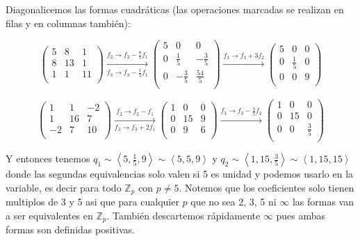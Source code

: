 \documentclass[12pt]{amsart}
\newcommand{\ZZ}{\mathbb{Z}}
\newcommand{\lp}{\left(}
\newcommand{\rp}{\right)}
\newcommand{\lc}{\left<}
\newcommand{\rc}{\right>}
\theoremstyle{plain}
\begin{document}
Diagonalicemos las formas cuadráticas (las operaciones 
marcadas se realizan en filas y en columnas también):

$$
\lp\begin{matrix}
    5&8&1 \\
    8&13&1 \\
    1&1&11 \\
\end{matrix}\rp
\xrightarrow[f_3 \to f_3-\frac{1}{5}f_1]{f_2 \to f_2-
\frac{8}{5}f_1}
\lp\begin{matrix}
    5&0&0 \\
    0&\frac{1}{5}&-\frac{3}{5} \\
    0&-\frac{3}{5}&\frac{54}{5} \\
\end{matrix}\rp
\xrightarrow{f_3 \to f_3+3f_2}
\lp\begin{matrix}
    5&0&0 \\
    0&\frac{1}{5}&0 \\
    0&0&9 \\
\end{matrix}\rp
$$

$$
\lp\begin{matrix}
    1&1&-2 \\
    1&16&7 \\
    -2&7&10 \\
\end{matrix}\rp
\xrightarrow[f_3 \to f_3+2f_1]{f_2 \to f_2-f_1}
\lp\begin{matrix}
    1&0&0 \\
    0&15&9 \\
    0&9&6 \\
\end{matrix}\rp
\xrightarrow{f_3 \to f_3-\frac{3}{5}f_2}
\lp\begin{matrix}
    1&0&0 \\
    0&15&0 \\
    0&0&\frac{3}{5} \\
\end{matrix}\rp
$$

Y entonces tenemos $q_1 \sim \lc 5,\frac{1}{5},9\rc \sim
\lc 5,5,9\rc$ y $q_2 \sim \lc 1,15,\frac{3}{5}\rc\sim 
\lc 1,15,15\rc$ donde las segundas equivalencias solo valen
si 5 es unidad y podemos usarlo en la variable, es decir
para todo $\ZZ_p$ con $p\neq 5$. Notemos que los coeficientes 
solo tienen multiplos de 3 y 5 asi que para cualquier $p$ que
no sea 2, 3, 5 ni $\infty$ las formas van a ser equivalentes 
en $\ZZ_p$. También descartemos rápidamente $\infty$ pues 
ambas formas son definidas positivas.
\end{document}
